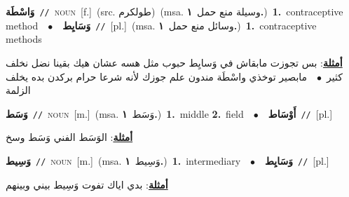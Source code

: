 \documentclass[10pt,a4paper,twoside]{article} %
\begin{document}
\begin{multicols}{2}
{\setlength\topsep{0pt}\textbf{\foreignlanguage{arabic}{وَاسْطَة}}\ {\color{gray}\texttt{//}\color{black}}\ \textsc{noun}\ [f.]\ (src. \color{gray}\foreignlanguage{arabic}{طولكرم}\color{black})\ \color{gray}(msa. \foreignlanguage{arabic}{وسيلة منع حمل}~\foreignlanguage{arabic}{\textbf{١.}})\color{black}\ \textbf{1.}~contraceptive method\ \ $\bullet$\ \ \setlength\topsep{0pt}\textbf{\foreignlanguage{arabic}{وَسَايِط}}\ {\color{gray}\texttt{//}\color{black}}\ [pl.]\ \color{gray}(msa. \foreignlanguage{arabic}{وسائل منع حمل}~\foreignlanguage{arabic}{\textbf{١.}})\color{black}\ \textbf{1.}~contraceptive methods\  \begin{flushright}\color{gray}\foreignlanguage{arabic}{\textbf{\underline{\foreignlanguage{arabic}{أمثلة}}}: بس تجوزت مابقاش في وَسايِط حبوب مثل هسه عشان هيك بقينا نضل نخلف كثير\ $\bullet$\ \  مابصير توخذي واسْطَة مندون علم جوزك لأنه شرعا حرام بركدن بده يخلف الزلمة}\end{flushright}\color{black}} \vspace{2mm}

{\setlength\topsep{0pt}\textbf{\foreignlanguage{arabic}{وَسَط}}\ {\color{gray}\texttt{//}\color{black}}\ \textsc{noun}\ [m.]\ \color{gray}(msa. \foreignlanguage{arabic}{وَسَط}~\foreignlanguage{arabic}{\textbf{١.}})\color{black}\ \textbf{1.}~middle  \textbf{2.}~field\ \ $\bullet$\ \ \setlength\topsep{0pt}\textbf{\foreignlanguage{arabic}{أَوْسَاط}}\ {\color{gray}\texttt{//}\color{black}}\ [pl.]\  \begin{flushright}\color{gray}\foreignlanguage{arabic}{\textbf{\underline{\foreignlanguage{arabic}{أمثلة}}}: الوَسَط الفني وَسَط وسخ}\end{flushright}\color{black}} \vspace{2mm}

{\setlength\topsep{0pt}\textbf{\foreignlanguage{arabic}{وَسِيط}}\ {\color{gray}\texttt{//}\color{black}}\ \textsc{noun}\ [m.]\ \color{gray}(msa. \foreignlanguage{arabic}{وَسِيط}~\foreignlanguage{arabic}{\textbf{١.}})\color{black}\ \textbf{1.}~intermediary\ \ $\bullet$\ \ \setlength\topsep{0pt}\textbf{\foreignlanguage{arabic}{وَسَايِط}}\ {\color{gray}\texttt{//}\color{black}}\ [pl.]\  \begin{flushright}\color{gray}\foreignlanguage{arabic}{\textbf{\underline{\foreignlanguage{arabic}{أمثلة}}}: بدي اياك تفوت وَسِيط بيني وبينهم}\end{flushright}\color{black}} \vspace{2mm}


\end{multicols}
\end{document}
